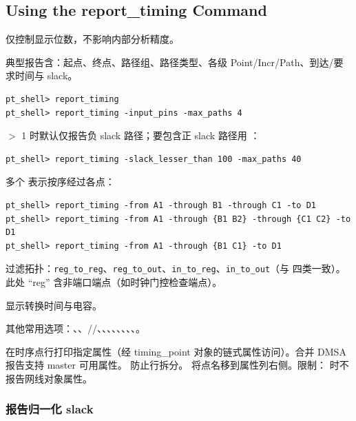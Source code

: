 \subsection*{Using the report\_timing Command}

 仅控制显示位数，不影响内部分析精度。

典型报告含：起点、终点、路径组、路径类型、各级 Point/Incr/Path、到达/要求时间与 slack。

\begin{lstlisting}
pt_shell> report_timing
pt_shell> report_timing -input_pins -max_paths 4
\end{lstlisting}

 $>$ 1 时默认仅报告负 slack 路径；要包含正 slack 路径用 ：
\begin{lstlisting}
pt_shell> report_timing -slack_lesser_than 100 -max_paths 40
\end{lstlisting}

多个  表示按序经过各点：
\begin{lstlisting}
pt_shell> report_timing -from A1 -through B1 -through C1 -to D1
pt_shell> report_timing -from A1 -through {B1 B2} -through {C1 C2} -to D1
pt_shell> report_timing -from A1 -through {B1 C1} -to D1
\end{lstlisting}

 过滤拓扑：\texttt{reg\_to\_reg}、\texttt{reg\_to\_out}、\texttt{in\_to\_reg}、\texttt{in\_to\_out}（与  四类一致）。此处 “reg” 含非端口端点（如时钟门控检查端点）。

 显示转换时间与电容。

其他常用选项：、、//、、、、、、、、。

 在时序点行打印指定属性（经 timing\_point 对象的链式属性访问）。合并 DMSA 报告支持 master 可用属性。 防止行拆分。 将点名移到属性列右侧。限制： 时不报告网线对象属性。

\subsubsection{报告归一化 slack}

